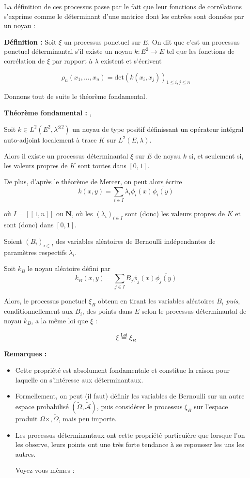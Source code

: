 \documentclass[12pt]{article}
\let\oldsum\sum
\renewcommand{\sum}{\oldsum\limits}
\begin{document}
La définition de ces processus passe par le fait que leur fonctions de corrélations s'exprime comme le déterminant d'une matrice dont les entrées sont données par un noyau :

\textbf{Définition :} Soit $ \xi $ un processus ponctuel sur $E$. On dit que c'est un processus ponctuel déterminantal s'il existe un noyau $ k : E^2 \to E $ tel que les fonctions de corrélation de $ \xi $ par rapport à $ \lambda $ existent et s'écrivent 

$$ \rho_n(x_1,...,x_n) = \mathrm{det}(k(x_i,x_j))_{1 \leqslant i,j \leqslant n} $$

Donnons tout de suite le théorème fondamental. 

\textbf{Théorème fondamental :} \cite{Macchi1975}, \cite{Soshnikov2000}

Soit $k \in L^2(E^2, \lambda^{\otimes 2}) $ un noyau de type positif définissant un opérateur intégral auto-adjoint localement à trace $K$ sur $ L^2(E, \lambda) $. 

Alors il existe un processus déterminantal $ \xi $ sur $E$ de noyau $k$ si, et seulement si, les valeurs propres de $K$ sont toutes dans $[0,1]$.

De plus, d'après le théorème de Mercer, on peut alors écrire $$ k(x,y) = \sum_{i \in I} \lambda_i \phi_i (x) \overline{\phi_i(y)} $$ 

où $I = [\![ 1,n]\!]$ ou $ \mathbf N $, où les $ (\lambda_i)_{i \in I} $ sont (donc) les valeurs propres de $K$ et sont (donc) dans $[0,1]$.

Soient $ (B_i)_{i \in I} $ des variables aléatoires de Bernoulli indépendantes de paramètres respectifs $ \lambda_i $.

Soit $ k_B $ le noyau aléatoire défini par $$ k_B(x,y) = \sum_{j \in I} B_j \phi_j(x) \overline{\phi_j(y)} $$

Alors, le processus ponctuel $ \xi_B $ obtenu en tirant les variables aléatoires $ B_i $ \textit{puis}, conditionnellement aux $B_i$, des points dans $E$ selon le processus déterminantal de noyau $ k_B $, a la même loi que $ \xi $ :

$$ \xi \overset{\text{Loi}}{=} \xi_B $$

\textbf{Remarques :} 

\begin{itemize}
  
  \item Cette propriété est absolument fondamentale et constitue la raison pour laquelle on s'intéresse aux déterminantaux.

  \item Formellement, on peut (il faut) définir les variables de Bernoulli sur un autre espace probabilisé $ (\tilde{\Omega}, \tilde{\mathcal A}) $, puis considérer le processus $ \xi_B $ sur l'espace produit $ \Omega \times,  \tilde \Omega $, mais peu importe.

  \item Les processus déterminantaux ont cette propriété particuière que lorsque l'on les observe, leurs points ont une très forte tendance à se repousser les uns les autres.

  Voyez vous-mêmes :

\end{itemize}
\end{document}
